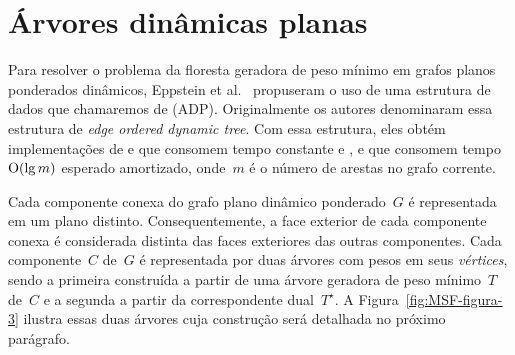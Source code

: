 \newpage
\section{Árvores dinâmicas planas}
\label{sec:ADP}

Para resolver o problema da floresta geradora de peso mínimo em grafos planos ponderados dinâmicos, Eppstein et al.~\cite{EPPSTEIN-planar} propuseram o uso de uma estrutura de dados que chamaremos de  (ADP). Originalmente os autores denominaram essa estrutura de \textit{edge ordered dynamic tree}.
Com essa estrutura, eles obtém implementações de \MSFCreate{} e \MSFweight{} que consomem tempo constante e \MSFaddEdge{}, \MSFdelEdge{} e \MSFupdate{} que consomem tempo~$\mathrm{O}(\lg m)$ esperado amortizado, onde~$m$ é o número de arestas no grafo corrente. 



Cada componente conexa do grafo plano dinâmico ponderado~$G$ é representada em um plano distinto.
Consequentemente, a face exterior de cada componente conexa é considerada distinta das faces exteriores das outras componentes.
Cada componente~$C$ de~$G$ é representada por duas árvores com pesos em seus \textit{vértices}, sendo a primeira construída a partir de uma árvore geradora de peso mínimo~$T$ de~$C$ e a segunda a partir da correspondente dual~$T^\star$.
A Figura~\ref{fig:MSF-figura-3} ilustra essas duas árvores cuja construção será detalhada no próximo parágrafo.

